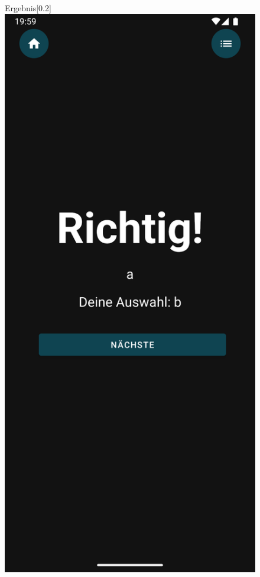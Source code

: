 \documentclass[12pt,a4paper]{article}
\begin{document}
\begin{figure}[h]
    \centering
    \begin{subcaptionbox}{Ergebnis\label{fig:bild1}}[0.2\linewidth]
        {\includegraphics[width=\linewidth]{showcase/result.png}}

\end{subcaptionbox}
\end{figure}
\end{document}
